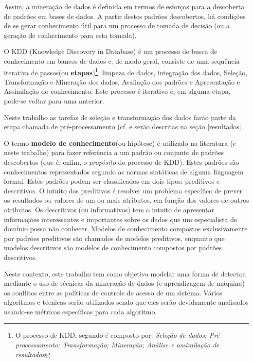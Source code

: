 Assim, a mineração de dados  é definida em termos de esforços para a descoberta de padrões em bases de dados. A partir destes padrões descobertos, há condições de se gerar conhecimento útil para um processo de tomada de decisão (ou a geração de conhecimento para esta tomada).

O KDD (Knowledge Discovery in Database) é um processo de busca de conhecimento em bancos de dados e, de modo geral, consiste de uma sequência iterativa de passos(ou \textbf{etapas})\footnote{O processo de KDD, segundo \cite{fayyad1996} é composto por: \textit{Seleção de dados; Pré-processamento; Transformação; Mineração; Análise e assimilação de resultados}}: limpeza de dados, integração dos dados, Seleção, Transformação e Mineração dos dados, Avaliação dos padrões e Apresentação e Assimilação do conhecimento. Este processo é iterativo e, em alguma etapa, pode-se voltar para uma anterior. \cite{Boscarioli2017}

Neste trabalho as tarefas de seleção e transformação dos dados farão parte da etapa chamada de pré-processamento (cf. \cite{Boscarioli2017} e serão descritas na seção \ref{resultados}.

O termo \textbf{modelo de conhecimento}(ou hipótese) é utilizado na literatura (e neste trabalho) para fazer referência a um padrão ou conjunto de padrões descobertos (que é, enfim, o \textit{propósito} do processo de KDD). Estes padrões são conhecimentos representados segundo as normas sintáticas de alguma linguagem formal. Estes padrões podem ser classificados em dois tipos: preditivos e descritivos. O intuito dos preditivos é resolver um problema específico de prever os resultados ou valores de um ou mais atributos, em função dos valores de outros atributos. Os descritivos (ou informativos) tem o intuito de apresentar informações interessantes e importantes sobre os dados que um especialista de domínio possa não conhecer. Modelos de conhecimento compostos exclusivamente por padrões preditivos são chamados de modelos preditivos, enquanto que modelos descritivos são modelos de conhecimento compostos por padrões descritivos. \cite{goldschmidt2005}\cite{ferrari2017}\cite{Boscarioli2017}

Neste contexto, este trabalho tem como objetivo modelar uma forma de detectar, mediante o uso de técnicas da mineração de dados (e aprendizagem de máquina) os conflitos entre as políticas de controle de acesso de um sistema. Vários algoritmos e técnicas serão utilizados sendo que eles serão devidamente analisados usando-se métricas específicas para cada algoritmo.


